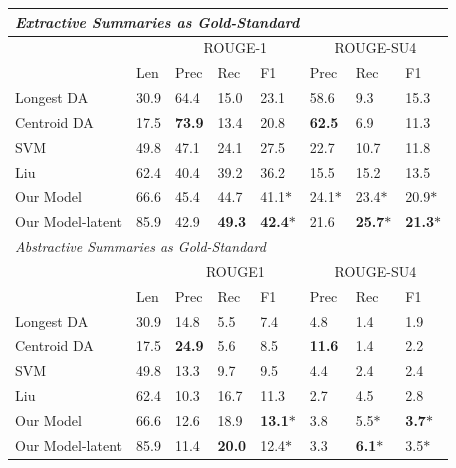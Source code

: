 \begin{table}[ht]

\parbox{.47\linewidth}{\fontsize{8}{9}\selectfont
\setlength{\tabcolsep}{0.8mm}
\begin{tabular}{|l|l|l|l|l|l|l|l|}

\hline

	\multicolumn{8}{|l|}{\textit{Extractive Summaries as Gold-Standard}}\\ \hline
    & &\multicolumn{3}{c|}{\textsc{ROUGE-1}} & \multicolumn{3}{c|}{\textsc{ROUGE-SU4}}\\ \hline
    & Len & Prec & Rec & F1 & Prec & Rec & F1\\ 
	Longest DA & 30.9 & 64.4 & 15.0  & 23.1 & 58.6 & 9.3 & 15.3 \\ 
   	Centroid DA & 17.5 & {\bf 73.9} & 13.4 & 20.8 & {\bf 62.5} & 6.9 & 11.3 \\ 
	SVM & 49.8& 47.1 & 24.1 & 27.5 & 22.7 & 10.7 & 11.8 \\ 
    Liu \cite{liu2009unsupervised} & 62.4& 40.4 & 39.2 & 36.2 & 15.5 & 15.2 & 13.5 \\ 
    \hline\hline
	Our Model & 66.6 & 45.4 & 44.7 & 41.1$\ast$ & 24.1$\ast$ & 23.4$\ast$ & 20.9$\ast$ \\ 
   	Our Model-latent & 85.9 & 42.9 & {\bf 49.3} & {\bf 42.4}$\ast$ & 21.6 & {\bf 25.7}$\ast$ & {\bf 21.3}$\ast$ \\ 
   
 \hline\hline

	\multicolumn{8}{|l|}{\textit{Abstractive Summaries as Gold-Standard}}\\ \hline
    & &\multicolumn{3}{c|}{\textsc{ROUGE1}} & \multicolumn{3}{c|}{\textsc{ROUGE-SU4}}\\ \hline
    &  Len & Prec & Rec & F1 & Prec & Rec & F1\\ 
	Longest DA & 30.9 & 14.8  & 5.5 & 7.4 & 4.8 & 1.4 & 1.9 \\ 
   	Centroid DA & 17.5 &{\bf 24.9} &  5.6 & 8.5 & {\bf 11.6} & 1.4 & 2.2 \\ 
   	SVM & 49.8& 13.3& 9.7  & 9.5 & 4.4 & 2.4 & 2.4 \\ 
    Liu \cite{liu2009unsupervised} & 62.4& 10.3 & 16.7 & 11.3 & 2.7 & 4.5 & 2.8 \\ 
    \hline\hline
    
	Our Model & 66.6& 12.6 & 18.9 & {\bf 13.1}$\ast$ & 3.8 & 5.5$\ast$ & {\bf 3.7}$\ast$ \\ 
	Our Model-latent & 85.9 & 11.4 & {\bf 20.0} & 12.4$\ast$ & 3.3 & {\bf 6.1}$\ast$ & 3.5$\ast$ \\ 
   

\end{tabular}}
\end{table}
